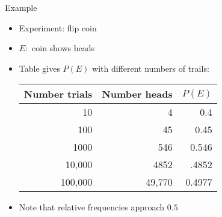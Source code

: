 \documentclass[handout]{beamer}
\theoremstyle{definition}
\begin{document}
\begin{frame}{Example}
\begin{itemize}
\item Experiment: flip coin
\item $E:$ coin shows heads
\item Table gives $P\left(E\right)$ with different numbers of trails:
\begin{center}\begin{tabular}{rrr}
Number trials&Number heads&$P\left(E\right)$\\\hline
10&4&0.4\\
100&45&0.45\\
1000&546&0.546\\
10,000&4852&.4852\\
100,000&49,770&0.4977
\end{tabular}\end{center}
\item Note that relative frequencies approach $0.5$
\end{itemize}
\end{frame}
\end{document}
